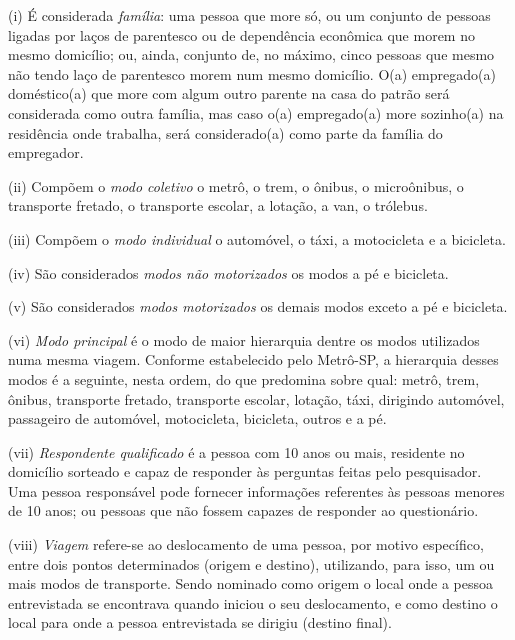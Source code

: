 \begin{compactitem}[]
\item (i) É considerada \emph{família}: uma pessoa que more só, ou um conjunto de pessoas ligadas por laços de parentesco ou de dependência econômica que morem no mesmo domicílio; ou, ainda, conjunto de, no máximo, cinco pessoas que mesmo não tendo laço de parentesco morem num mesmo domicílio. O(a) empregado(a) doméstico(a) que more com algum outro parente na casa do patrão será considerada como outra família, mas caso o(a) empregado(a) more sozinho(a) na residência onde trabalha, será considerado(a) como parte da família do empregador.

\item (ii) Compõem o \emph{modo coletivo} o metrô, o trem, o ônibus, o microônibus, o transporte fretado, o transporte escolar, a lotação, a van, o trólebus.

\item (iii) Compõem o \emph{modo individual} o automóvel, o táxi, a motocicleta e a bicicleta.

\item (iv) São considerados \emph{modos não motorizados} os modos a pé e bicicleta.

\item (v) São considerados \emph{modos motorizados} os demais modos exceto a pé e bicicleta.

\item (vi) \emph{Modo principal} é o modo de maior hierarquia dentre os modos utilizados numa mesma viagem. Conforme estabelecido pelo Metrô-SP, a hierarquia desses modos é a seguinte, nesta ordem, do que predomina sobre qual: metrô, trem, ônibus, transporte fretado, transporte escolar, lotação, táxi, dirigindo automóvel, passageiro de automóvel, motocicleta, bicicleta, outros e a pé.

\item (vii) \emph{Respondente qualificado} é a pessoa com 10 anos ou mais, residente no domicílio sorteado e capaz de responder às perguntas feitas pelo pesquisador. Uma pessoa responsável pode fornecer informações referentes às pessoas menores de 10 anos; ou pessoas que não fossem capazes de responder ao questionário.

\item (viii) \emph{Viagem} refere-se ao deslocamento de uma pessoa, por motivo específico, entre dois pontos determinados (origem e destino), utilizando, para isso, um ou mais modos de transporte. Sendo nominado como origem o local onde a pessoa entrevistada se encontrava quando iniciou o seu deslocamento, e como destino o local para onde a pessoa entrevistada se dirigiu (destino final).


\end{compactitem}
